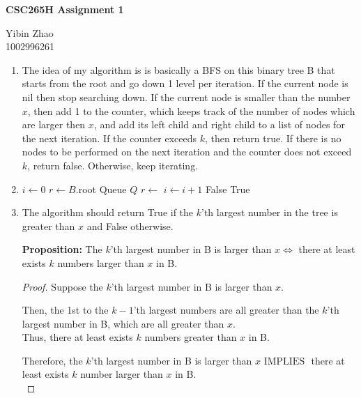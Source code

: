\documentclass[10pt]{article}
\newcommand{\iimplies}{\mbox{ IMPLIES }}
\begin{document}
\begin{center}
{\bf \Large \bf CSC265H Assignment 1}\\
\end{center}

\noindent
Yibin Zhao\\
1002996261\\


\begin{enumerate}

\item
	The idea of my algorithm is is basically a BFS on this binary tree B that starts from the root and go down 1 level per iteration. If the current node is nil then stop searching down. If the current node is smaller than the number $x$, then add 1 to the counter, which keeps track of the number of nodes which are larger then $x$, and add its left child and right child to a list of nodes for the next iteration. If the counter exceeds $k$, then return true. If there is no nodes to be performed on the next iteration and the counter does not exceed $k$, return false. Otherwise, keep iterating.

\item 
\begin{algorithmic}[1]
		\State $i \gets 0$
		\State $r \gets B$.root
		\State Queue $Q$ 
		\State {} 
		 
			\State $r \gets$ 
				\State {}
				\State {}
				\State $i \gets i+1$
			\EndIf
		\EndWhile
			\State \Return False
		\Else
			\State \Return True
		\EndIf
	\EndFunction
\end{algorithmic}


\item %
	The algorithm should return True if the $k$'th largest number in the tree is greater than $x$ and False otherwise. 
   
\begin{addmargin}[1em]{0em}
    \textbf{Proposition:} The $k$'th largest number in B is larger than $x
    \iff$ there at least exists $k$ numbers larger than $x$ in B.
    
    \begin{proof}
        Suppose the $k$'th largest number in B is larger than $x$. 
        \begin{addmargin}[1em]{0em}
            Then, the 1st to the $k-1$'th largest numbers are all greater than the $k$'th largest number in B, which are all greater than $x$. \\
            Thus, there at least exists $k$ numbers greater than $x$ in B. 
        \end{addmargin}
        Therefore, the $k$'th largest number in B is larger than $x \iimplies$ there at least exists $k$ number larger than $x$ in B. \\


\end{proof}
\end{addmargin}
\end{enumerate}
\end{document}
